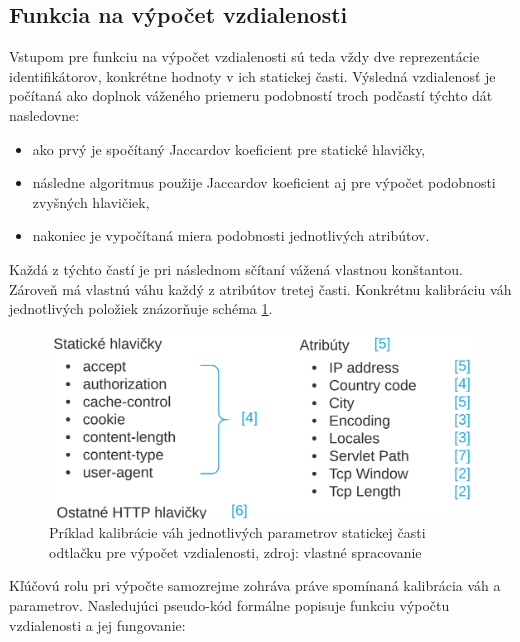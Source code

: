 \documentclass[
  printed, %
  table,   %
  lof,     %
  nolot,   %
  nocover
]{fithesis3}
\begin{document}
\subsection{Funkcia na výpočet vzdialenosti}
\label{ss:distance-function}
Vstupom pre funkciu na výpočet vzdialenosti sú teda vždy dve reprezentácie
identifikátorov, konkrétne hodnoty v ich statickej časti. Výsledná vzdialenosť
je počítaná ako doplnok váženého priemeru podobností troch podčastí týchto dát
nasledovne:

\begin{itemize}
	\item ako prvý je spočítaný Jaccardov koeficient pre statické hlavičky,
	\item následne algoritmus použije Jaccardov koeficient aj pre výpočet podobnosti
	zvyšných hlavičiek,
	\item nakoniec je vypočítaná miera podobnosti jednotlivých atribútov. 
\end{itemize}

\noindent Každá z týchto častí je pri následnom sčítaní vážená vlastnou konštantou.
Zároveň má vlastnú váhu každý z atribútov tretej časti. Konkrétnu kalibráciu
váh jednotlivých položiek znázorňuje schéma \ref{fig:footprint-distance-cal}.

\begin{figure}[H]
  \centering
    \includegraphics[width=.90\textwidth]{images/footprint-distance-cal.png}
  \caption{Príklad kalibrácie váh jednotlivých parametrov statickej časti
  odtlačku pre výpočet vzdialenosti, zdroj: vlastné spracovanie}
  \label{fig:footprint-distance-cal}
\end{figure}

Kľúčovú rolu pri výpočte samozrejme zohráva práve spomínaná kalibrácia váh a parametrov.
Nasledujúci pseudo-kód formálne popisuje funkciu výpočtu vzdialenosti a jej fungovanie:
\end{document}
